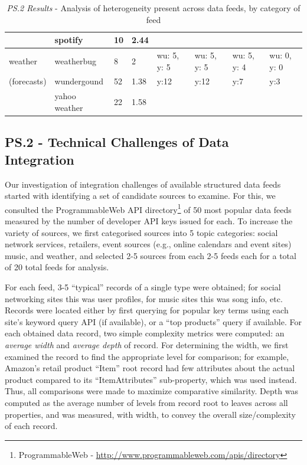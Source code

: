 \documentclass{sigchi}
\begin{document}
\begin{table}
\begin{tabular}{p{2.0cm}  p{1.8cm}  p{1.8cm}  p{1.8cm}  p{1.8cm}  p{1.8cm}  p{1.8cm}  p{1.8cm}}
				& spotify			& 10						& 2.44					&				&						&						& \\
\hline
weather			& weatherbug		& 8						& 2						& wu: 5, y: 5		& wu: 5, y: 5				& wu: 5, y: 4				& wu: 0, y: 0 \\
(forecasts)		& wundergound	& 52						& 1.38					& y:12			& y:12					& y:7						& y:3 \\
				& yahoo weather	& 22						& 1.58					&				&						&						& \\
\end{tabular}
\caption{\emph{PS.2 Results} - Analysis of heterogeneity present across data feeds, by category of feed}\label{tbl:prestudy2}
\end{table}


\subsection{PS.2 - Technical Challenges of Data Integration}
Our investigation of integration challenges of available structured data feeds started with identifying a set of candidate sources to examine.  For this, we consulted the ProgrammableWeb API directory\footnote{ProgrammableWeb - \url{http://www.programmableweb.com/apis/directory}} of 50 most popular data feeds measured by the number of developer API keys issued for each.  To increase the variety of sources, we first categorised sources into 5 topic categories: social network services, retailers, event sources (e.g., online calendars and event sites) music, and weather, and selected 2-5 sources from each 2-5 feeds each for a total of 20 total feeds for analysis.  

For each feed, 3-5 ``typical'' records of a single type were obtained; for social networking sites this was user profiles, for music sites this was song info, etc.  Records were located either by first querying for popular key terms using each site's keyword query API (if available), or a ``top products'' query if available.  For each obtained data record, two simple complexity metrics were computed: an \emph{average width} and \emph{average depth} of record.  For determining the width, we first examined the record to find the appropriate level for comparison; for example, Amazon's retail product ``Item'' root record had few attributes about the actual product compared to its ``ItemAttributes'' sub-property, which was used instead. Thus, all comparisons were made to maximize comparative similarity.  Depth was computed as the average number of levels from record root to leaves across all properties, and was measured, with width, to convey the overall size/complexity of each record.
\end{document}
